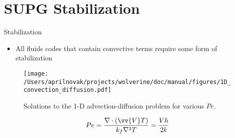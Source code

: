 \documentclass{beamer}
\begin{document}

\section{SUPG Stabilization}

\begin{frame}{Stabilization}

\begin{itemize}
\item All fluids codes that contain convective terms require some form of stabilization
\end{itemize}

\begin{figure}[H]
  \centering
  \texttt{[image: /Users/aprilnovak/projects/wolverine/doc/manual/figures/1D\_convection\_diffusion.pdf]}
  \caption{Solutions to the 1-D advection-diffusion problem for various \(Pe\).}
\end{figure}

\small
\begin{equation}
Pe=\frac{\nabla\cdot(\vv{V}T)}{k_f\nabla^2 T}= \frac{Vh}{2k}
\end{equation}
\normalsize
\end{frame}

\end{document}
